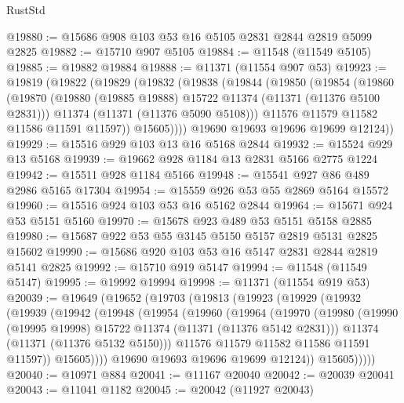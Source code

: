 \begin{lexlean}{RustStd}
\begin{coremodule}
{\begin{coremodule}
{{{{{{{{{{{{{{{{{{{{{{{{{{{{{{{{{@19880 := @15686 @908 @103 @53 @16 @5105 @2831 @2844 @2819 @5099 @2825
@19882 := @15710 @907 @5105
@19884 := @11548 (@11549 @5105)
@19885 := @19882 @19884
@19888 := @11371 (@11554 @907 @53)
@19923 := @19819
    (@19822
      (@19829
        (@19832
          (@19838
            (@19844
              (@19850
                (@19854
                  (@19860
                    (@19870
                      (@19880 (@19885 @19888) @15722 @11374 (@11371 (@11376 @5100 @2831)))
                      @11374
                      (@11371 (@11376 @5090 @5108)))
                    @11576
                    @11579
                    @11582
                    @11586
                    @11591
                    @11597))
                @15605))))
        @19690
        @19693
        @19696
        @19699
        @12124))
@19929 := @15516 @929 @103 @13 @16 @5168 @2844
@19932 := @15524 @929 @13 @5168
@19939 := @19662 @928 @1184 @13 @2831 @5166 @2775 @1224
@19942 := @15511 @928 @1184 @5166
@19948 := @15541 @927 @86 @489 @2986 @5165 @17304
@19954 := @15559 @926 @53 @55 @2869 @5164 @15572
@19960 := @15516 @924 @103 @53 @16 @5162 @2844
@19964 := @15671 @924 @53 @5151 @5160
@19970 := @15678 @923 @489 @53 @5151 @5158 @2885
@19980 := @15687 @922 @53 @55 @3145 @5150 @5157 @2819 @5131 @2825 @15602
@19990 := @15686 @920 @103 @53 @16 @5147 @2831 @2844 @2819 @5141 @2825
@19992 := @15710 @919 @5147
@19994 := @11548 (@11549 @5147)
@19995 := @19992 @19994
@19998 := @11371 (@11554 @919 @53)
@20039 := @19649
    (@19652
      (@19703
        (@19813
          (@19923
            (@19929
              (@19932
                (@19939
                  (@19942
                    (@19948
                      (@19954
                        (@19960
                          (@19964
                            (@19970
                              (@19980
                                (@19990 (@19995 @19998) @15722 @11374 (@11371 (@11376 @5142 @2831)))
                                @11374
                                (@11371 (@11376 @5132 @5150)))
                              @11576
                              @11579
                              @11582
                              @11586
                              @11591
                              @11597))
                          @15605))))
                  @19690
                  @19693
                  @19696
                  @19699
                  @12124))
              @15605)))))
@20040 := @10971 @884
@20041 := @11167 @20040
@20042 := @20039 @20041
@20043 := @11041 @1182
@20045 := @20042 (@11927 @20043)
}}}}}}}}}}}}}}}}}}}}}}}}}}}}}}}}}
\end{coremodule}}
\end{coremodule}
\end{lexlean}
